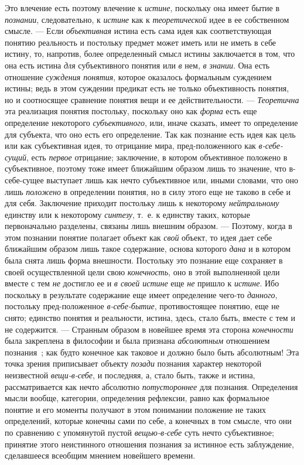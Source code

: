 \documentclass[twoside]{article}
\begin{document}
{Это влечение есть поэтому влечение к
{\em истине}, поскольку
она имеет бытие в {\em познании},
следовательно, к
{\em истине} как к
{\em теоретической} идее
в ее собственном смысле. — Если
{\em объективная} истина
есть сама идея как соответствующая понятию реальность и постольку предмет
может иметь или не иметь в себе истину, то, напротив, более определенный
смысл истины заключается в том, что она есть истина
{\em для} субъективного
понятия или {\em в} нем,
{\em в знании}. Она есть
отношение {\em суждения понятия},
которое оказалось формальным суждением истины; ведь в этом
суждении предикат есть не только объективность понятия, но и соотносящее
сравнение понятия вещи и ее действительности. —
{\em Теоретична} эта
реализация понятия постольку, поскольку оно как
{\em форма} есть еще
определение некоторого
{\em субъективного}, или,
иначе сказать, имеет то определение для субъекта, что оно есть его
определение. Так как познание есть идея как цель или как субъективная идея,
то отрицание мира, пред-положенного как
{\em в-себе-сущий}, есть
{\em первое} отрицание;
заключение, в котором объективное положено в субъективное, поэтому тоже
имеет ближайшим образом лишь то значение, что в-себе-сущее выступает лишь
как нечто субъективное или, иными словами, что оно лишь
{\em положено} в
определении понятия, но в силу этого еще не таково в себе и для себя.
Заключение приходит постольку лишь к некоторому
{\em нейтральному}
единству или к некоторому
{\em синтезу}, т.~е. к
единству таких, которые первоначально разделены, связаны лишь внешним
образом. — Поэтому, когда в этом познании понятие полагает
объект как {\em свой}
объект, то идея дает себе ближайшим образом лишь такое
содержание, основа которого {\em дана}
и в котором была снята лишь форма внешности. Постольку это
познание еще сохраняет в своей осуществленной цели свою
{\em конечность}, оно в
этой выполненной цели вместе с тем
{\em не} достигло ее и
{\em в своей истине} еще
{\em не} пришло к
{\em истине}. Ибо
поскольку в результате содержание еще имеет определение чего-то
{\em данного}, постольку
пред-положенное {\em в-себе-бытие},
противостоящее понятию, еще не снято; единство понятия и
реальности, истина, здесь, стало быть, вместе с тем и не содержится. —
Странным образом в новейшее время эта сторона
{\em конечности} была
закреплена в философии и была признана
{\em абсолютным}
отношением
познания~\label{bkm:bm100};
как будто конечное как таковое и должно было быть абсолютным!
Эта точка зрения приписывает объекту
{\em позади} познания
характер некоторой неизвестной
{\em вещи-в-себе}, и
последняя, а, стало быть, также и истина, рассматривается
как нечто абсолютно {\em потустороннее}
для познания. Определения мысли вообще, категории,
определения рефлексии, равно как формальное понятие и его моменты получают
в этом понимании положение не таких определений, которые конечны сами по
себе, а конечных в том смысле, что они по сравнению с упомянутой пустой
{\em вещью-в-себе }суть
нечто субъективное; принятие этого неистинного отношения познания за
истинное есть заблуждение, сделавшееся всеобщим мнением новейшего времени.

}
\end{document}
